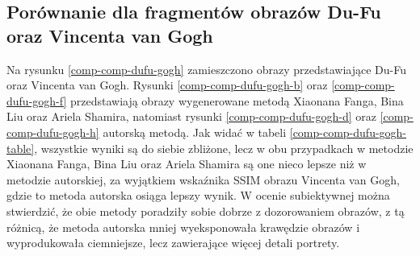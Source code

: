         \subsection{Porównanie dla fragmentów obrazów Du-Fu oraz Vincenta van Gogh}
    	Na rysunku \ref{comp-comp-dufu-gogh} zamieszczono obrazy przedstawiające Du-Fu oraz Vincenta van Gogh. Rysunki \ref{comp-comp-dufu-gogh-b} oraz \ref{comp-comp-dufu-gogh-f} przedstawiają obrazy wygenerowane metodą Xiaonana Fanga, Bina Liu oraz Ariela Shamira, natomiast rysunki \ref{comp-comp-dufu-gogh-d} oraz \ref{comp-comp-dufu-gogh-h} autorską metodą. Jak widać w tabeli \ref{comp-comp-dufu-gogh-table}, wszystkie wyniki są do siebie zbliżone, lecz w obu przypadkach w metodzie Xiaonana Fanga, Bina Liu oraz Ariela Shamira są one nieco lepsze niż w metodzie autorskiej, za wyjątkiem wskaźnika SSIM obrazu Vincenta van Gogh, gdzie to metoda autorska osiąga lepszy wynik. W ocenie subiektywnej można stwierdzić, że obie metody poradziły sobie dobrze z dozorowaniem obrazów, z tą różnicą, że metoda autorska mniej wyeksponowała krawędzie obrazów i wyprodukowała ciemniejsze, lecz zawierające więcej detali portrety.
